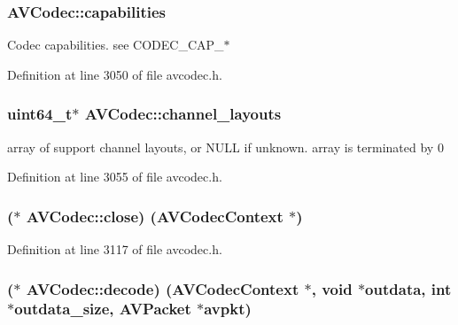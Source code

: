 \subsubsection[{\texorpdfstring{capabilities}{capabilities}}]{ A\+V\+Codec\+::capabilities}\hypertarget{struct_a_v_codec_af51f7ff3dac8b730f46b9713e49a2518}{}\label{struct_a_v_codec_af51f7ff3dac8b730f46b9713e49a2518}
Codec capabilities. see C\+O\+D\+E\+C\+\_\+\+C\+A\+P\+\_\+$\ast$ 

Definition at line 3050 of file avcodec.\+h.

\subsubsection[{\texorpdfstring{channel\+\_\+layouts}{channel_layouts}}]{ {\bf uint64\+\_\+t}$\ast$ A\+V\+Codec\+::channel\+\_\+layouts}\hypertarget{struct_a_v_codec_a1d4c5152626bbd1f575a3e0014cb59e7}{}\label{struct_a_v_codec_a1d4c5152626bbd1f575a3e0014cb59e7}


array of support channel layouts, or N\+U\+LL if unknown. array is terminated by 0 



Definition at line 3055 of file avcodec.\+h.

\subsubsection[{\texorpdfstring{close}{close}}]{($\ast$ A\+V\+Codec\+::close) ({\bf A\+V\+Codec\+Context} $\ast$)}\hypertarget{struct_a_v_codec_a7e200e27b37d64d1f941260aeffeb265}{}\label{struct_a_v_codec_a7e200e27b37d64d1f941260aeffeb265}


Definition at line 3117 of file avcodec.\+h.

\subsubsection[{\texorpdfstring{decode}{decode}}]{($\ast$ A\+V\+Codec\+::decode) ({\bf A\+V\+Codec\+Context} $\ast$, {\bf void} $\ast$outdata, {\bf int} $\ast$outdata\+\_\+size, {\bf A\+V\+Packet} $\ast$avpkt)}\hypertarget{struct_a_v_codec_a2e8ca285370a79a060026b9c36f65f0d}{}\label{struct_a_v_codec_a2e8ca285370a79a060026b9c36f65f0d}


